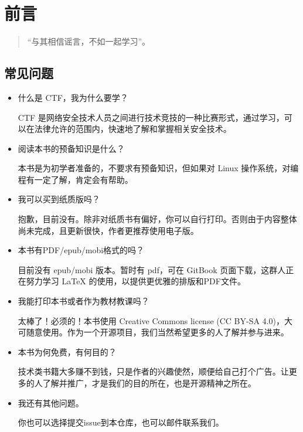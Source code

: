 \chapter{前言}

\begin{quote}
    “与其相信谣言，不如一起学习”。
\end{quote}

\section{常见问题}

\begin{itemize}\setlength{\parindent}{2em}
    \item 什么是 CTF，我为什么要学？
    
    CTF 是网络安全技术人员之间进行技术竞技的一种比赛形式，通过学习，可以在法律允许的范围内，快速地了解和掌握相关安全技术。

    \item 阅读本书的预备知识是什么？
    
    本书是为初学者准备的，不要求有预备知识，但如果对 Linux 操作系统，对编程有一定了解，肯定会有帮助。

    \item 我可以买到纸质版吗？
    
    抱歉，目前没有。除非对纸质书有偏好，你可以自行打印。否则由于内容整体尚未完成，且更新很快，作者更推荐使用电子版。
    
    \item 本书有PDF/epub/mobi格式的吗？
    
    目前没有 epub/mobi 版本。暂时有 pdf，可在 GitBook 页面下载，这群人正在努力学习 \LaTeX\␣ 的使用，以提供更优雅的排版和PDF文件。
    
    \item 我能打印本书或者作为教材教课吗？
    
    太棒了！必须的！本书使用 Creative Commons license (CC BY-SA 4.0)，大可随意使用。作为一个开源项目，我们当然希望更多的人了解并参与进来。
    
    \item 本书为何免费，有何目的？
    
    技术类书籍大多赚不到钱，只是作者的兴趣使然，顺便给自己打个广告。让更多的人了解并推广，才是我们的目的所在，也是开源精神之所在。
    
    \item 我还有其他问题。
    
    你也可以选择提交issue到本仓库，也可以邮件联系我们。
    
\end{itemize}

